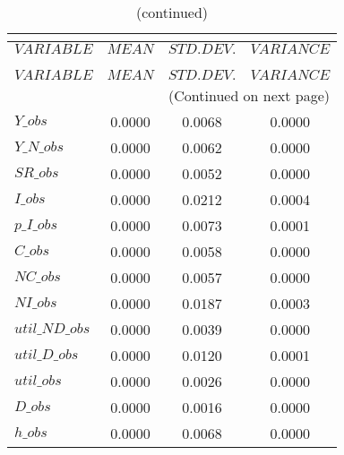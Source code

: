  
\begin{center}
\begin{longtable}{lccc} 
\caption{THEORETICAL MOMENTS}\\
 \label{Table:th_moments}\\
\toprule 
$VARIABLE       $	 & 	 $         MEAN$	 & 	 $    STD. DEV.$	 & 	 $     VARIANCE$\\
\midrule \endfirsthead 
\caption{(continued)}\\
 \toprule \\ 
$VARIABLE       $	 & 	 $         MEAN$	 & 	 $    STD. DEV.$	 & 	 $     VARIANCE$\\
\midrule \endhead 
\midrule \multicolumn{4}{r}{(Continued on next page)} \\ \bottomrule \endfoot 
\bottomrule \endlastfoot 
$Y\_obs         $	 & 	       0.0000	 & 	       0.0068	 & 	       0.0000 \\ 
$Y\_N\_obs      $	 & 	       0.0000	 & 	       0.0062	 & 	       0.0000 \\ 
$SR\_obs        $	 & 	       0.0000	 & 	       0.0052	 & 	       0.0000 \\ 
$I\_obs         $	 & 	       0.0000	 & 	       0.0212	 & 	       0.0004 \\ 
$p\_I\_obs      $	 & 	       0.0000	 & 	       0.0073	 & 	       0.0001 \\ 
$C\_obs         $	 & 	       0.0000	 & 	       0.0058	 & 	       0.0000 \\ 
$NC\_obs        $	 & 	       0.0000	 & 	       0.0057	 & 	       0.0000 \\ 
$NI\_obs        $	 & 	       0.0000	 & 	       0.0187	 & 	       0.0003 \\ 
$util\_ND\_obs  $	 & 	       0.0000	 & 	       0.0039	 & 	       0.0000 \\ 
$util\_D\_obs   $	 & 	       0.0000	 & 	       0.0120	 & 	       0.0001 \\ 
$util\_obs      $	 & 	       0.0000	 & 	       0.0026	 & 	       0.0000 \\ 
$D\_obs         $	 & 	       0.0000	 & 	       0.0016	 & 	       0.0000 \\ 
$h\_obs         $	 & 	       0.0000	 & 	       0.0068	 & 	       0.0000 \\ 
\end{longtable}
 \end{center}
